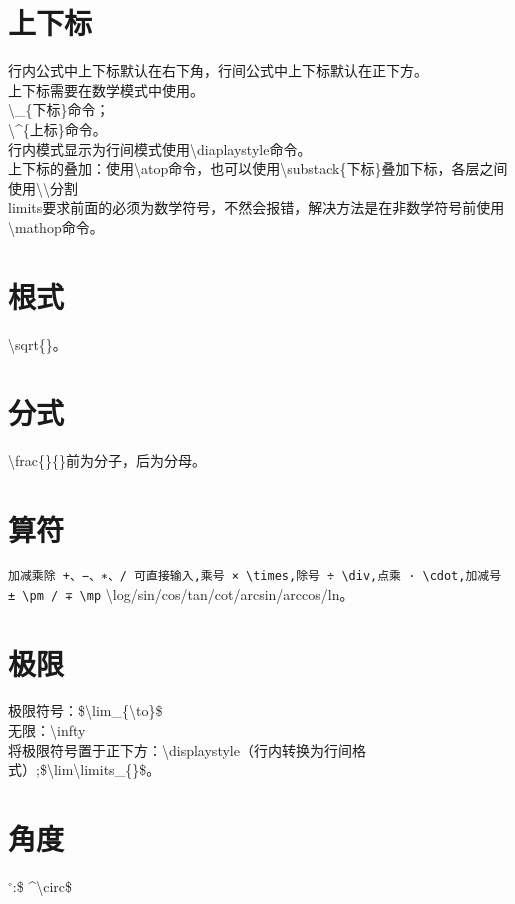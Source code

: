 \documentclass{book}%
\begin{document}
    \section{上下标}
    行内公式中上下标默认在右下角，行间公式中上下标默认在正下方。\\
    上下标需要在数学模式中使用。\\
    \textbackslash \_\{下标\}命令；\\
    \textbackslash \^\quad\{上标\}命令。\\
    行内模式显示为行间模式使用\textbackslash diaplaystyle命令。\\
    上下标的叠加：使用\textbackslash atop命令，也可以使用\textbackslash substack\{下标\}叠加下标，各层之间使用\textbackslash \textbackslash 分割\\
    limits要求前面的必须为数学符号，不然会报错，解决方法是在非数学符号前使用\textbackslash mathop命令。
    
    \section{根式}
    \textbackslash sqrt\{\}。
    
    \section{分式}
    \textbackslash frac\{\}\{\}前为分子，后为分母。
    
    \section{算符}
    \verb|加减乘除 +、−、∗、/ 可直接输入,乘号 × \times,除号 ÷ \div,点乘 · \cdot,加减号 ± \pm / ∓ \mp|
    \textbackslash log/sin/cos/tan/cot/arcsin/arccos/ln。
    
    \section{极限}
    极限符号：\$\textbackslash lim\_\{\textbackslash to\}\$\\
    无限：\textbackslash infty\\
    将极限符号置于正下方：\textbackslash displaystyle（行内转换为行间格式）;\$\textbackslash lim\textbackslash limits\_\{\}\$。
    
    \section{角度}
    $^\circ$:\$ \^ \enspace \textbackslash circ\$    
    
\end{document}
